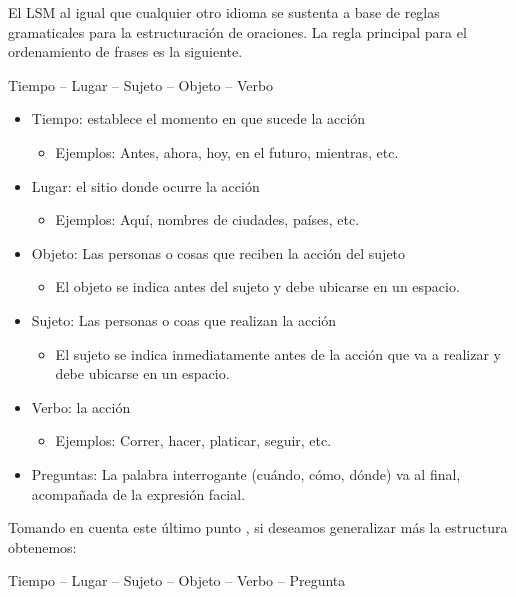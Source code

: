 El LSM al igual que cualquier otro idioma se sustenta a base de reglas gramaticales para la estructuración de oraciones. La regla principal para el ordenamiento de frases es la siguiente.

\begin{centering}

Tiempo – Lugar – Sujeto – Objeto – Verbo

\end{centering}

\begin{itemize}

\item	Tiempo: establece el momento en que sucede la acción
\begin{itemize}
\item	Ejemplos: Antes, ahora, hoy, en el futuro, mientras, etc.
\end{itemize}
\item	Lugar: el sitio donde ocurre la acción
\begin{itemize}
\item	Ejemplos: Aquí, nombres de ciudades, países, etc.
\end{itemize}
\item	Objeto: Las personas o cosas que reciben la acción del sujeto
\begin{itemize}
\item	El objeto se indica antes del sujeto y debe ubicarse en un espacio.
\end{itemize}
\item	Sujeto: Las personas o coas que realizan la acción
\begin{itemize}
\item	El sujeto se indica inmediatamente antes de la acción que va a realizar y debe ubicarse en un espacio.
\end{itemize}
\item	Verbo: la acción
\begin{itemize}
\item	Ejemplos: Correr, hacer, platicar, seguir, etc.
\end{itemize}
\item	Preguntas: La palabra interrogante (cuándo, cómo, dónde) va al final, acompañada de la expresión facial.

\end{itemize}

Tomando en cuenta este último punto , si deseamos generalizar más la estructura obtenemos:

\begin{centering}
Tiempo – Lugar – Sujeto – Objeto – Verbo – Pregunta
\end{centering}

